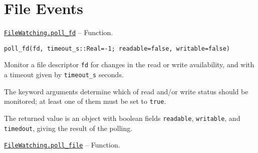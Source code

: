\chapter{File Events}


\hypertarget{4018465060202185434}{} 
\hyperlink{4018465060202185434}{\texttt{FileWatching.poll\_fd}}  -- {Function.}

\begin{adjustwidth}{2em}{0pt}


\begin{verbatim}
poll_fd(fd, timeout_s::Real=-1; readable=false, writable=false)
\end{verbatim}

Monitor a file descriptor \texttt{fd} for changes in the read or write availability, and with a timeout given by \texttt{timeout\_s} seconds.

The keyword arguments determine which of read and/or write status should be monitored; at least one of them must be set to \texttt{true}.

The returned value is an object with boolean fields \texttt{readable}, \texttt{writable}, and \texttt{timedout}, giving the result of the polling.



\end{adjustwidth}
\hypertarget{16623395181067730756}{} 
\hyperlink{16623395181067730756}{\texttt{FileWatching.poll\_file}}  -- {Function.}

